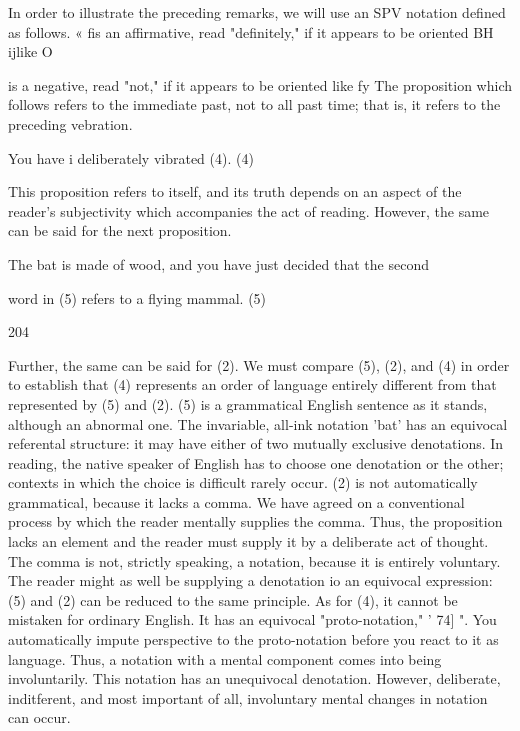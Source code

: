\documentclass[10pt,twoside]{memoir}
\begin{document}
\begin{enumerate}
{{{{{In order to illustrate the preceding remarks, we will use an SPV 
notation defined as follows. 
« fis an affirmative, read "definitely," if it appears to be oriented 
BH ijlike O 

is a negative, read "not," if it appears to be oriented like fy 
The proposition which follows refers to the immediate past, not to all past 
time; that is, it refers to the preceding vebration. 

You have i deliberately vibrated (4). (4) 


This proposition refers to itself, and its truth depends on an aspect of the 
reader's subjectivity which accompanies the act of reading. However, the 
same can be said for the next proposition. 

The bat is made of wood, and you have just decided that the second 


word in (5) refers to a flying mammal. (5) 


204 


Further, the same can be said for (2). We must compare (5), (2), and (4) in 
order to establish that (4) represents an order of language entirely different 
from that represented by (5) and (2). (5) is a grammatical English sentence 
as it stands, although an abnormal one. The invariable, all-ink notation 'bat' 
has an equivocal referental structure: it may have either of two mutually 
exclusive denotations. In reading, the native speaker of English has to choose 
one denotation or the other; contexts in which the choice is difficult rarely 
occur. (2) is not automatically grammatical, because it lacks a comma. We 
have agreed on a conventional process by which the reader mentally supplies 
the comma. Thus, the proposition lacks an element and the reader must 
supply it by a deliberate act of thought. The comma is not, strictly speaking, 
a notation, because it is entirely voluntary. The reader might as well be 
supplying a denotation io an equivocal expression: (5) and (2) can be 
reduced to the same principle. As for (4), it cannot be mistaken for ordinary 
English. It has an equivocal "proto-notation," ' 74] ". You automatically 
impute perspective to the proto-notation before you react to it as language. 
Thus, a notation with a mental component comes into being involuntarily. 
This notation has an unequivocal denotation. However, deliberate, 
inditferent, and most important of all, involuntary mental changes in 
notation can occur. 

}}}}}
\end{enumerate}
\end{document}
